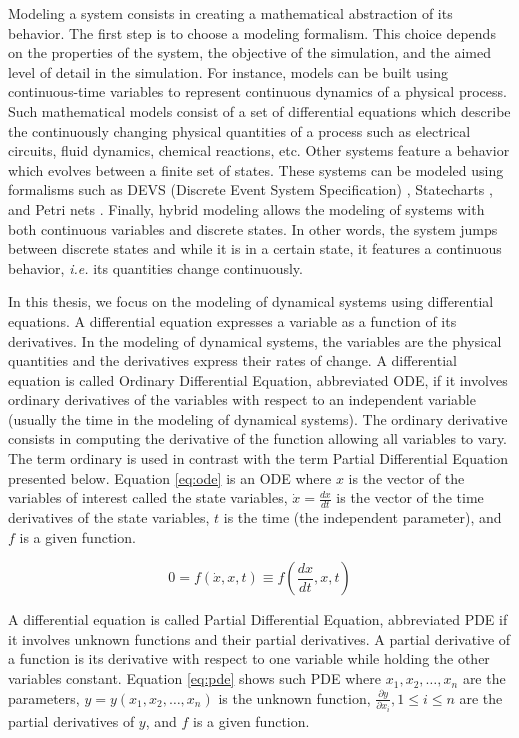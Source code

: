 Modeling a system consists in creating a mathematical abstraction of its behavior. The first step is to choose a modeling formalism. This choice depends on the properties of the system, the objective of the simulation, and the aimed level of detail in the simulation. For instance, models can be built using continuous-time variables to represent continuous dynamics of a physical process. Such mathematical models consist of a set of differential equations which describe the continuously changing physical quantities of a process such as electrical circuits, fluid dynamics, chemical reactions, etc. Other systems feature a behavior which evolves between a finite set of states. These systems can be modeled using formalisms such as DEVS (Discrete Event System Specification) \cite{zeigler:2000}, Statecharts \cite{harel:1987}, and Petri nets \cite{petri:1962}. Finally, hybrid modeling allows the modeling of systems with both continuous variables and discrete states. In other words, the system jumps between discrete states and while it is in a certain state, it features a continuous behavior, {\em i.e.} its quantities change continuously. 

In this thesis, we focus on the modeling of dynamical systems using differential equations. A differential equation expresses a variable as a function of its derivatives. In the modeling of dynamical systems, the variables are the physical quantities and the derivatives express their rates of change. A differential equation is called Ordinary Differential Equation, abbreviated ODE, if it involves ordinary derivatives of the variables with respect to an independent variable (usually the time in the modeling of dynamical systems). The ordinary derivative consists in computing the derivative of the function allowing all variables to vary. The term ordinary is used in contrast with the term Partial Differential Equation presented below. Equation \ref{eq:ode} is an ODE where $x$ is the vector of the variables of interest called the state variables, $\dot{x} = \frac{dx}{dt}$ is the vector of the time derivatives of the state variables, $t$ is the time (the independent parameter), and $f$ is a given function.

\begin{equation}
 0 = f(\dot{x},x,t) \equiv f(\frac{dx}{dt},x,t)
\label{eq:ode}
\end{equation}

A differential equation is called Partial Differential Equation, abbreviated PDE if it involves unknown functions and their partial derivatives. A partial derivative of a function is its derivative with respect to one variable while holding the other variables constant. Equation \ref{eq:pde} shows such PDE where $x_1,x_2,\dots, x_n$ are the parameters, $y=y(x_1,x_2,\dots, x_n)$ is the unknown function, $\frac{\partial y}{\partial x_i}, 1 \leq i \leq n$ are the partial  derivatives of $y$, and $f$ is a given function.

